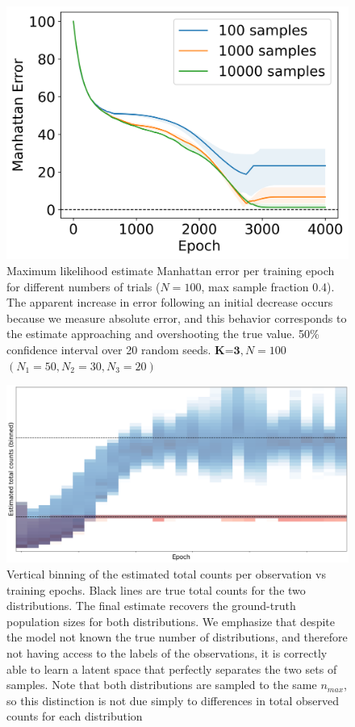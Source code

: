 \documentclass{article}
\theoremstyle{plain}
\theoremstyle{definition}
\theoremstyle{remark}
\begin{document}
\begin{figure}[h]
    \centering
    \includegraphics[width=0.5\columnwidth]{sgd_k3_50ci.png}
     \caption{Maximum likelihood estimate Manhattan error per training epoch for different numbers of trials ($N=100$, max sample fraction 0.4). The apparent increase in error following an initial decrease occurs because we measure absolute error, and this behavior corresponds to the estimate approaching and overshooting the true value. 50\% confidence interval over 20 random seeds. $\textbf{K=3}, N=100$ $(N_1=50, N_2=30, N_3=20)$}
     \label{fig:sgd_k=3}
\end{figure}

\begin{figure}[h]
    \centering
    \includegraphics[width=0.5\columnwidth]{vae_trajectory.png}
    \caption{Vertical binning of the estimated total counts per observation vs training epochs. Black lines are true total counts for the two distributions. The final estimate recovers the ground-truth population sizes for both distributions. We emphasize that despite the model not known the true number of distributions, and therefore not having access to the labels of the observations, it is correctly able to learn a latent space that perfectly separates the two sets of samples. Note that both distributions are sampled to the same $n_{max}$, so this distinction is not due simply to differences in total observed counts for each distribution}
    \label{fig:vae_trajectory}
\end{figure}
\end{document}
